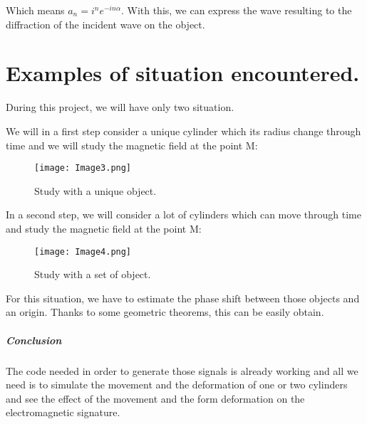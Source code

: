 Which means $a_n = i^n e^{-i n \alpha} $. With this, we can express the wave resulting to the diffraction of the incident wave on the object.

\chapter{Examples of situation encountered.}

During this project, we will have only two situation.

We will in a first step consider a unique  cylinder which its radius change through time and we will study the magnetic field at the point M:

\begin{figure}[H]
\centering
    \texttt{[image: Image3.png]}
    \caption{Study with a unique object.}
    \label{fig:Image3}
\end{figure}

In a second step, we will consider a lot of cylinders which can move through time and study the magnetic field at the point M: 

\begin{figure}[H]
\centering
    \texttt{[image: Image4.png]}
    \caption{Study with a set of object.}
    \label{fig:Image4}
\end{figure}

For this situation, we have to estimate the phase shift between those objects and an origin. Thanks to some geometric theorems, this can be easily obtain. 


\bigskip

\paragraph{Conclusion}
The code needed in order to generate those signals is already working and all we need is to simulate the movement and the deformation of one or two cylinders and see the effect of the movement and the form deformation on the electromagnetic signature.

